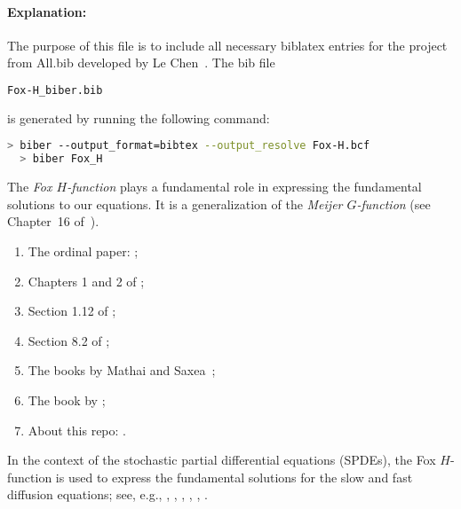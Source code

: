 \documentclass{article}
\begin{document}
\paragraph{Explanation:}


The purpose of this file is to include all necessary biblatex entries  for the
project  from All.bib developed by Le Chen~\cite{chen:23:spdes-bib}. The bib
file

\begin{lstlisting}[language=bash]
   Fox-H_biber.bib
\end{lstlisting}

is generated by running the following command:

\begin{lstlisting}[language=bash]
  > biber --output_format=bibtex --output_resolve Fox-H.bcf
  > biber Fox_H
\end{lstlisting}

The \textit{Fox $H$-function} plays a fundamental role in expressing the
fundamental solutions to our equations. It is a generalization of the
\textit{Meijer $G$-function} (see Chapter~16 of~\cite{olver.lozier.ea:10:nist}). 

\begin{enumerate}
  \item The ordinal paper: \cite{fox:61:g};
  \item Chapters 1 and 2 of \cite{kilbas.saigo:04:h-transforms};
  \item Section 1.12 of \cite{kilbas.srivastava.ea:06:theory};
  \item Section 8.2 of \cite{prudnikov.brychkov.ea:90:integrals};
  \item The books by Mathai and Saxea~\cite{mathai.saxena.ea:10:h-function,
    mathai.saxena:78:h-function};
  \item The book by \cite{eidelman.ivasyshen.ea:04:analytic};
  \item About this repo: \cite{chen.hu:23:some}.
\end{enumerate}

In the context of the stochastic partial differential equations (SPDEs), the Fox
$H$-function is used to express the fundamental solutions for the slow and fast
diffusion equations; see, e.g., \cite{chen.hu.ea:17:space-time},
\cite{chen.hu.ea:19:nonlinear}, \cite{chen.eisenberg:22:interpolating},
\cite{chen.hu:22:holder}, \cite{chen.guo.ea:22:moments},
\cite{mijena.nane:15:space-time}.

\printbibliography[title={References}]
\end{document}
